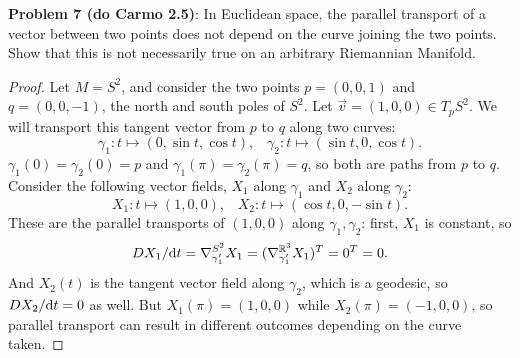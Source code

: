 \documentclass{amsart}
\begin{document}
	\textbf{Problem 7 (do Carmo 2.5)}: In Euclidean space, the parallel transport of a vector between two points does not depend on the curve joining the two points. Show that this is not necessarily true on an arbitrary Riemannian Manifold.
	\begin{proof}
		Let $M=S^2$, and consider the two points $p = (0,0,1)$ and $q=(0,0,-1)$, the north and south poles of $S^2$. Let $\vec{v} =(1,0,0) \in T_pS^2$. We will transport this tangent vector from $p$ to $q$ along two curves: 
		$$
		\gamma_1:t\mapsto (0,\sin t,\cos t), \;\;\; \gamma_2:t\mapsto (\sin t,0,\cos t).
		$$
		$\gamma_1(0)=\gamma_2(0)=p$ and $\gamma_1(\pi)=\gamma_2(\pi)=q$, so both are paths from $p$ to $q$. Consider the following vector fields, $X_1$ along $\gamma_1$ and $X_2$ along $\gamma_2$:
		$$
		X_1:t\mapsto (1,0,0), \;\;\; X_2:t\mapsto (\cos t, 0 ,-\sin t).
		$$
		These are the parallel transports of $(1,0,0)$ along $\gamma_1,\gamma_2$: first, $X_1$ is constant, so
		$$
		DX_1/\textrm{d} t = \nabla^{S^2}_{\gamma_1'} X_1 = (\nabla^{\mathbb{R}^3}_{\gamma_1'} X_1)^T = 0^T = 0.
		$$
		And $X_2(t)$ is the tangent vector field along $\gamma_2$, which is a geodesic, so $DX_2/\textrm{d} t=0$ as well.
		But $X_1(\pi)=(1,0,0)$ while $X_2(\pi)=(-1,0,0)$, so parallel transport can result in different outcomes depending on the curve taken.
	\end{proof}\\
	
	\newpage
	
\end{document}
